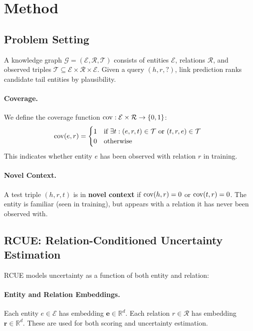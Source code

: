 \section{Method}
\label{sec:method}

\subsection{Problem Setting}

A knowledge graph $\mathcal{G} = (\mathcal{E}, \mathcal{R}, \mathcal{T})$ consists of entities $\mathcal{E}$, relations $\mathcal{R}$, and observed triples $\mathcal{T} \subseteq \mathcal{E} \times \mathcal{R} \times \mathcal{E}$. Given a query $(h, r, ?)$, link prediction ranks candidate tail entities by plausibility.

\paragraph{Coverage.}
We define the coverage function $\mathrm{cov}: \mathcal{E} \times \mathcal{R} \to \{0, 1\}$:
\[
\mathrm{cov}(e, r) = \begin{cases}
1 & \text{if } \exists t: (e, r, t) \in \mathcal{T} \text{ or } (t, r, e) \in \mathcal{T} \\
0 & \text{otherwise}
\end{cases}
\]
This indicates whether entity $e$ has been observed with relation $r$ in training.

\paragraph{Novel Context.}
A test triple $(h, r, t)$ is in \textbf{novel context} if $\mathrm{cov}(h, r) = 0$ or $\mathrm{cov}(t, r) = 0$. The entity is familiar (seen in training), but appears with a relation it has never been observed with.

\subsection{RCUE: Relation-Conditioned Uncertainty Estimation}

RCUE models uncertainty as a function of both entity and relation:

\paragraph{Entity and Relation Embeddings.}
Each entity $e \in \mathcal{E}$ has embedding $\mathbf{e} \in \mathbb{R}^d$. Each relation $r \in \mathcal{R}$ has embedding $\mathbf{r} \in \mathbb{R}^d$. These are used for both scoring and uncertainty estimation.

